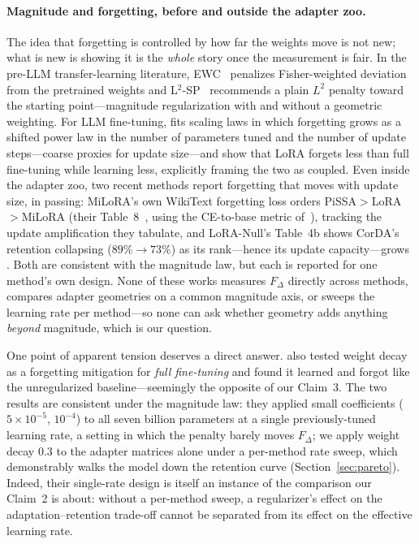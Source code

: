 \documentclass[11pt]{article}
\newcommand{\dw}{F_{\Delta}}
\begin{document}
\paragraph{Magnitude and forgetting, before and outside the adapter zoo.} The
idea that forgetting is controlled by how far the weights move is not new; what is
new is showing it is the \emph{whole} story once the measurement is fair. In the
pre-LLM transfer-learning literature, EWC~\citep{kirkpatrick2017ewc} penalizes
Fisher-weighted deviation from the pretrained weights and
L$^2$-SP~\citep{li2018l2sp} recommends a plain $L^2$ penalty toward the starting
point---magnitude regularization with and without a geometric weighting. For LLM
fine-tuning, \citet{kalajdzievski2024scaling} fits scaling laws in which
forgetting grows as a shifted power law in the number of parameters tuned and the
number of update steps---coarse proxies for update size---and
\citet{biderman2024lora} show that LoRA forgets less than full fine-tuning while
learning less, explicitly framing the two as coupled. Even inside the adapter zoo,
two recent methods report forgetting that moves with update size, in passing:
MiLoRA's own WikiText forgetting loss orders PiSSA${>}$LoRA${>}$MiLoRA (their
Table~8~\citep{wang2024milora}, using the CE-to-base metric
of~\citealp{kalajdzievski2024scaling}), tracking the update amplification they
tabulate, and LoRA-Null's Table~4b shows CorDA's retention collapsing
($89\%{\to}73\%$) as its rank---hence its update capacity---grows
\citep{tang2025loranull}. Both are consistent with the magnitude law, but each is
reported for one method's own design. None of these works measures
$\dw$ directly across methods, compares adapter geometries on a common magnitude
axis, or sweeps the learning rate per method---so none can ask whether geometry adds
anything \emph{beyond} magnitude, which is our question.

One point of apparent tension deserves a direct answer.
\citet{biderman2024lora} also tested weight decay as a forgetting mitigation for
\emph{full fine-tuning} and found it learned and forgot like the unregularized
baseline---seemingly the opposite of our Claim~3. The two results are consistent
under the magnitude law: they applied small coefficients ($5\times10^{-5}$,
$10^{-4}$) to all seven billion parameters at a single previously-tuned learning
rate, a setting in which the penalty barely moves $\dw$; we apply weight decay
$0.3$ to the adapter matrices alone under a per-method rate sweep, which
demonstrably walks the model down the retention curve
(Section~\ref{sec:pareto}). Indeed, their single-rate design is itself an
instance of the comparison our Claim~2 is about: without a per-method sweep, a
regularizer's effect on the adaptation--retention trade-off cannot be separated
from its effect on the effective learning rate.
\end{document}
